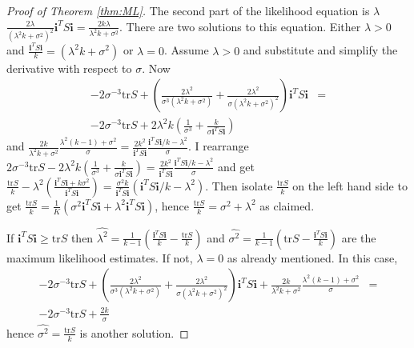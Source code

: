 \documentclass[twoside]{article}
\begin{document}
\begin{proof}[Proof of Theorem \ref{thm:ML}]
The second part of the likelihood equation is $\lambda$$\frac{2\lambda}{\left(\lambda^{2}k+\sigma^{2}\right)^{2}}\mathbf{i}^{T}S\mathbf{i}=\frac{2k\lambda}{\lambda^{2}k+\sigma^{2}}$.
There are two solutions to this equation. Either $\lambda>0$ and
$\frac{\mathbf{i}^{T}S\mathbf{i}}{k}=\left(\lambda^{2}k+\sigma^{2}\right)$
or $\lambda=0$. Assume $\lambda>0$ and substitute and simplify the
derivative with respect to $\sigma$. Now
\begin{eqnarray*}
-2\sigma^{-3}\textrm{tr}S+\left(\frac{2\lambda^{2}}{\sigma^{3}\left(\lambda^{2}k+\sigma^{2}\right)}+\frac{2\lambda^{2}}{\sigma\left(\lambda^{2}k+\sigma^{2}\right)^{2}}\right)\mathbf{i}^{T}S\mathbf{i} & =\\
-2\sigma^{-3}\textrm{tr}S+2\lambda^{2}k\left(\frac{1}{\sigma^{3}}+\frac{k}{\sigma\mathbf{i}^{T}S\mathbf{i}}\right)
\end{eqnarray*}
and $\frac{2k}{\lambda^{2}k+\sigma^{2}}\frac{\lambda^{2}\left(k-1\right)+\sigma^{2}}{\sigma}=\frac{2k^{2}}{\mathbf{i}^{T}S\mathbf{i}}\frac{\mathbf{i}^{T}S\mathbf{i}/k-\lambda^{2}}{\sigma}$.
I rearrange $2\sigma^{-3}\textrm{tr}S-2\lambda^{2}k\left(\frac{1}{\sigma^{3}}+\frac{k}{\sigma\mathbf{i}^{T}S\mathbf{i}}\right)=\frac{2k^{2}}{\mathbf{i}^{T}S\mathbf{i}}\frac{\mathbf{i}^{T}S\mathbf{i}/k-\lambda^{2}}{\sigma}$
and get $\frac{\textrm{tr}S}{k}-\lambda^{2}\left(\frac{\mathbf{i}^{T}S\mathbf{i}+k\sigma^{2}}{\mathbf{i}^{T}S\mathbf{i}}\right)=\frac{\sigma^{2}k}{\mathbf{i}^{T}S\mathbf{i}}\left(\mathbf{i}^{T}S\mathbf{i}/k-\lambda^{2}\right)$.
Then isolate $\frac{\textrm{tr}S}{k}$ on the left hand side to get
$\frac{\textrm{tr}S}{k}=\frac{1}{K}\left(\sigma^{2}\mathbf{i}^{T}S\mathbf{i}+\lambda^{2}\mathbf{i}^{T}S\mathbf{i}\right)$,
hence $\frac{\textrm{tr}S}{k}=\sigma^{2}+\lambda^{2}$ as claimed.

If $\mathbf{i}^{T}S\mathbf{i}\geq\textrm{tr}S$ then $\hat{\lambda^{2}}=\frac{1}{k-1}\left(\frac{\mathbf{i}^{T}S\mathbf{i}}{k}-\frac{\textrm{tr}S}{k}\right)$
and $\hat{\sigma^{2}}=\frac{1}{k-1}\left(\textrm{tr}S-\frac{\mathbf{i}^{T}S\mathbf{i}}{k}\right)$
are the maximum likelihood estimates. If not, $\lambda=0$ as already
mentioned. In this case,
\begin{eqnarray*}
-2\sigma^{-3}\textrm{tr}S+\left(\frac{2\lambda^{2}}{\sigma^{3}\left(\lambda^{2}k+\sigma^{2}\right)}+\frac{2\lambda^{2}}{\sigma\left(\lambda^{2}k+\sigma^{2}\right)^{2}}\right)\mathbf{i}^{T}S\mathbf{i}+\frac{2k}{\lambda^{2}k+\sigma^{2}}\frac{\lambda^{2}\left(k-1\right)+\sigma^{2}}{\sigma} & =\\
-2\sigma^{-3}\textrm{tr}S+\frac{2k}{\sigma}
\end{eqnarray*}
hence $\hat{\sigma^{2}}=\frac{\textrm{tr}S}{k}$ is another solution.


\end{proof}
\end{document}
